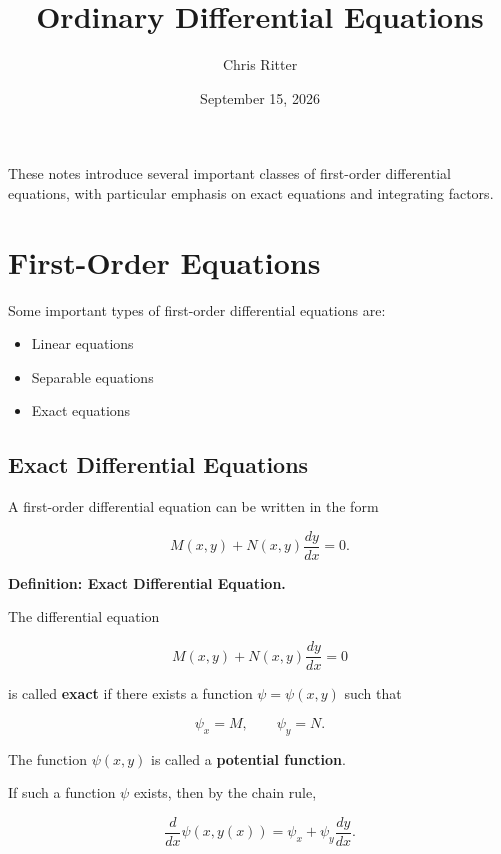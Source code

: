\documentclass[11pt]{article}
\title{Ordinary Differential Equations}
\author{Chris Ritter}
\date{September 15, 2026}
\newenvironment{definitionbox}[1]
    {\par\medskip\noindent\textbf{Definition: #1.}\par}
    {\par\medskip}
\begin{document}
\maketitle
\tableofcontents
\newpage

These notes introduce several important classes of first-order
differential equations, with particular emphasis on exact equations
and integrating factors.

\section{First-Order Equations}

Some important types of first-order differential equations are:

\begin{itemize}
    \item Linear equations
    \item Separable equations
    \item Exact equations
\end{itemize}

\subsection{Exact Differential Equations}

A first-order differential equation can be written in the form

\[
M(x,y)+N(x,y)\frac{dy}{dx}=0.
\]

\begin{definitionbox}{Exact Differential Equation}

The differential equation

\[
M(x,y)+N(x,y)\frac{dy}{dx}=0
\]

is called \textbf{exact} if there exists a function
$\psi=\psi(x,y)$ such that

\[
\psi_x=M,
\qquad
\psi_y=N.
\]

The function $\psi(x,y)$ is called a
\textbf{potential function}.

\end{definitionbox}

If such a function $\psi$ exists, then by the chain rule,

\[
\frac{d}{dx}\psi(x,y(x))
=
\psi_x+\psi_y\frac{dy}{dx}.
\]
\end{document}
